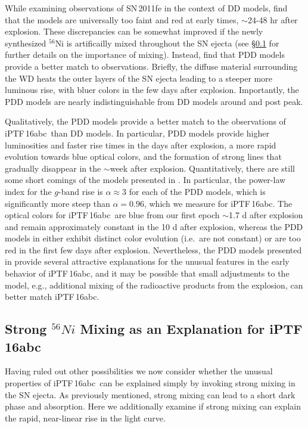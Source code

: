 \documentclass[twocolumn]{aastex61}
\newcommand{\abc}{iPTF\,16abc}
\begin{document}
While examining observations of SN\,2011fe in the context of DD models, \citet{2014MNRAS.441..532D} find that the models are universally too faint and red at early times, $\sim$24-48 hr after explosion. These discrepancies can be somewhat improved if the newly synthesized $^{56}$Ni is artificailly mixed throughout the SN ejecta (see \S\ref{sec:Ni_mixing} for further details on the importance of mixing). Instead, \citet{2014MNRAS.441..532D} find that PDD models provide a better match to observations. Briefly, the diffuse material surrounding the WD heats the outer layers of the SN ejecta leading to a steeper more luminous rise, with bluer colors in the few days after explosion. Importantly, the PDD models are nearly indistinguishable from DD models around and post peak. 

Qualitatively, the PDD models provide a better match to the observations of \abc\ than DD models. In particular, PDD models provide higher luminosities and faster rise times in the days after explosion, a more rapid evolution towards blue optical colors, and the formation of strong  lines that gradually disappear in the $\sim$week after explosion. Quantitatively, there are still some short comings of the models presented in \citet{2014MNRAS.441..532D}. In particular, the power-law index for the $g$-band rise is $\alpha \approx 3$ for each of the PDD models, which is significantly more steep than $\alpha = 0.96$, which we measure for \abc. The optical colors for \abc\ are blue from our first epoch $\sim$1.7 d after explosion and remain approximately constant in the 10 d after explosion, whereas the PDD models in \citet{2014MNRAS.441..532D} either exhibit distinct color evolution (i.e.\ are not constant) or are too red in the first few days after explosion. Nevertheless, the PDD models presented in \citet{2014MNRAS.441..532D} provide several attractive explanations for the unusual features in the early behavior of \abc, and it may be possible that small adjustments to the model, e.g., additional mixing of the radioactive products from the explosion, can better match \abc.

\subsection{Strong $^{56}Ni$ Mixing as an Explanation for \abc}
\label{sec:Ni_mixing}

Having ruled out other possibilities we now consider whether the unusual properties of \abc\ can be explained simply by invoking strong mixing in the SN ejecta. As previously mentioned, strong mixing can lead to a short dark phase and  absorption. Here we additionally examine if strong mixing can explain the rapid, near-linear rise in the light curve.
\end{document}
